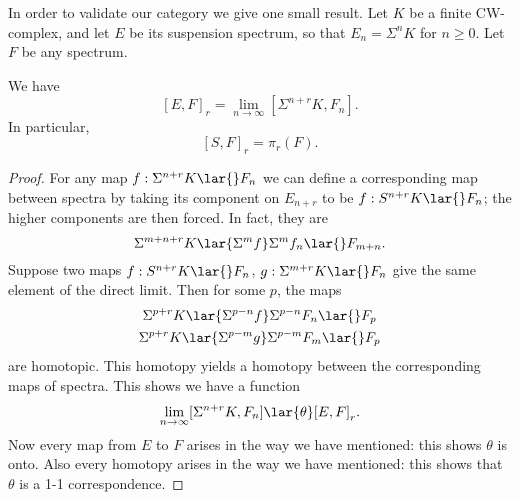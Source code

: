 \documentclass[../main]{subfiles}
\begin{document}
In order to validate our category we give one small result. Let $K$ be a finite CW-complex, and let $E$ be its suspension spectrum, so that $E_n=\Sigma  ^nK$ for $n\geq 0$. Let $F$ be any spectrum.

\begin{proposition}
We have
\[
[E,F]_r = \lim_{n\to\infty} [\Sigma  ^{n+r}K,F_n].
\]
In particular,
\[
[S,F]_r = \pi_r(F).
\]
\end{proposition}
\begin{proof}
For any map $f: \Sigma  ^{n+r}K\lar{} F_n$ we can define a corresponding map between spectra by taking its component on $E_{n+r}$ to be $f: S^{n+r}K\lar{}F_n$; the higher components are then forced. In fact, they are
\[
\Sigma  ^{m+n+r}K
\lar{\Sigma  ^mf}
\Sigma  ^mf_n
\lar{}
F_{m+n}.
\]
Suppose two maps $f: S^{n+r}K\lar{}F_n$, $g:\Sigma  ^{m+r}K\lar{}F_n$ give the same element of the direct limit. Then for some $p$, the maps
    \begin{gather*}
    \Sigma  ^{p+r}K
    \lar{\Sigma  ^{p-n}f}
    \Sigma  ^{p-n}F_n
    \lar{}
    F_p
    \\
    \Sigma  ^{p+r}K
    \lar{\Sigma  ^{p-m}g}
    \Sigma  ^{p-m}F_m
    \lar{}
    F_p
    \end{gather*}
are homotopic. This homotopy yields a homotopy between the corresponding maps of spectra. This shows we have a function
\[
\lim_{n\to\infty} [\Sigma  ^{n+r}K,F_n]
\lar{\theta}
[E,F]_r.
\]
Now every map from $E$ to $F$ arises in the way we have mentioned: this shows $\theta$ is onto. Also every homotopy arises in the way we have mentioned: this shows that $\theta$ is a 1-1 correspondence.
\end{proof}
\end{document}
